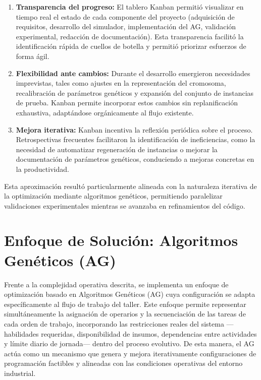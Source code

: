 \begin{enumerate}
    \item \textbf{Transparencia del progreso:} El tablero Kanban permitió visualizar en tiempo real el estado de cada componente del proyecto (adquisición de requisitos, desarrollo del simulador, implementación del AG, validación experimental, redacción de documentación). Esta transparencia facilitó la identificación rápida de cuellos de botella y permitió priorizar esfuerzos de forma ágil.
    
    \item \textbf{Flexibilidad ante cambios:} Durante el desarrollo emergieron necesidades imprevistas, tales como ajustes en la representación del cromosoma, recalibración de parámetros genéticos y expansión del conjunto de instancias de prueba. Kanban permite incorporar estos cambios sin replanificación exhaustiva, adaptándose orgánicamente al flujo existente.
    
    \item \textbf{Mejora iterativa:} Kanban incentiva la reflexión periódica sobre el proceso. Retrospectivas frecuentes facilitaron la identificación de ineficiencias, como la necesidad de automatizar regeneración de instancias o mejorar la documentación de parámetros genéticos, conduciendo a mejoras concretas en la productividad.
\end{enumerate}

Esta aproximación resultó particularmente alineada con la naturaleza iterativa de la optimización mediante algoritmos genéticos, permitiendo paralelizar validaciones experimentales mientras se avanzaba en refinamientos del código.

\section{Enfoque de Solución: Algoritmos Genéticos (AG)}

Frente a la complejidad operativa descrita, se implementa un enfoque de optimización basado en 
Algoritmos Genéticos (AG) cuya configuración se adapta específicamente al flujo de trabajo del 
taller. Este enfoque permite representar simultáneamente la asignación de operarios y la 
secuenciación de las tareas de cada orden de trabajo, incorporando las restricciones reales del 
sistema ---habilidades requeridas, disponibilidad de insumos, dependencias entre actividades y 
límite diario de jornada--- dentro del proceso evolutivo. De esta manera, el AG actúa como un 
mecanismo que genera y mejora iterativamente configuraciones de programación factibles y 
alineadas con las condiciones operativas del entorno industrial.


